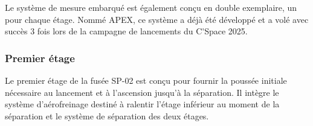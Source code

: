 Le système de mesure embarqué est également conçu en double exemplaire, un pour chaque étage. Nommé \gls{APEX}, ce système a déjà
été développé et a volé avec succès 3 fois lors de la campagne de lancements du \gls{C'Space} 2025.

\newpage

\subsubsection{Premier étage}

Le premier étage de la fusée SP-02 est conçu pour fournir la poussée initiale nécessaire au lancement et à l’ascension jusqu’à la
séparation. Il intègre le système d’aérofreinage destiné à ralentir l’étage inférieur au moment de la séparation et le système de
séparation des deux étages.\\

